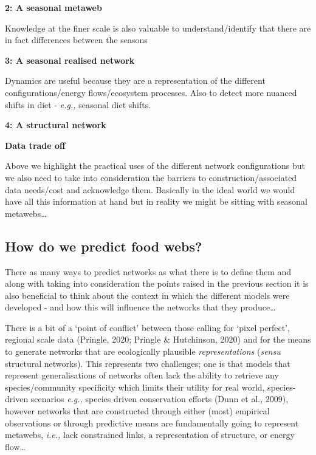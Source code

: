 \documentclass[
]{article}
\begin{document}
\begin{tcolorbox}
\textbf{2: A seasonal metaweb}

Knowledge at the finer scale is also valuable to understand/identify
that there are in fact differences between the seasons

\textbf{3: A seasonal realised network}

Dynamics are useful because they are a representation of the different
configurations/energy flows/ecosystem processes. Also to detect more
nuanced shifts in diet - \emph{e.g.,} seasonal diet shifts.

\textbf{4: A structural network}

\textbf{Data trade off}

Above we highlight the practical uses of the different network
configurations but we also need to take into consideration the barriers
to construction/associated data needs/cost and acknowledge them.
Basically in the ideal world we would have all this information at hand
but in reality we might be sitting with seasonal metawebs\ldots{}

\end{tcolorbox}

\subsection{How do we predict food
webs?}\label{how-do-we-predict-food-webs}

There as many ways to predict networks as what there is to define them
and along with taking into consideration the points raised in the
previous section it is also beneficial to think about the context in
which the different models were developed - and how this will influence
the networks that they produce\ldots{}

There is a bit of a `point of conflict' between those calling for `pixel
perfect', regional scale data (Pringle, 2020; Pringle \& Hutchinson,
2020) and for the means to generate networks that are ecologically
plausible \emph{representations} (\emph{sensu} structural networks).
This represents two challenges; one is that models that represent
generalisations of networks often lack the ability to retrieve any
species/community specificity which limits their utility for real world,
species-driven scenarios \emph{e.g.,} species driven conservation
efforts (Dunn et al., 2009), however networks that are constructed
through either (most) empirical observations or through predictive means
are fundamentally going to represent metawebs, \emph{i.e.,} lack
constrained links, a representation of structure, or energy flow\ldots{}
\end{document}
